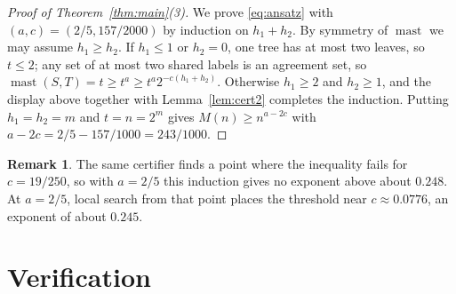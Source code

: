 \documentclass[11pt]{amsart}
\theoremstyle{definition}
\newtheorem{rem}[theorem]{Remark}
\newcommand{\mast}{\operatorname{mast}}
\begin{document}
\begin{proof}[Proof of Theorem~\ref{thm:main}(3)]
We prove \eqref{eq:ansatz} with $(a,c)=(2/5,157/2000)$ by induction on $h_1+h_2$. By symmetry of
$\mast$ we may assume $h_1\ge h_2$. If $h_1\le1$ or $h_2=0$, one tree has at most two leaves, so
$t\le2$; any set of at most two shared labels is an agreement set, so
$\mast(S,T)=t\ge t^a\ge t^a2^{-c(h_1+h_2)}$. Otherwise $h_1\ge2$ and $h_2\ge1$, and the display above
together with Lemma~\ref{lem:cert2} completes the induction. Putting $h_1=h_2=m$ and $t=n=2^m$ gives
$M(n)\ge n^{a-2c}$ with $a-2c=2/5-157/1000=243/1000$.
\end{proof}

\begin{rem}
The same certifier finds a point where the inequality fails for $c=19/250$, so with $a=2/5$ this
induction gives no exponent above about $0.248$. At $a=2/5$, local search from that point places
the threshold near $c\approx0.0776$, an exponent of about $0.245$.
\end{rem}

\section{Verification}\label{sec:verify}
\end{document}
